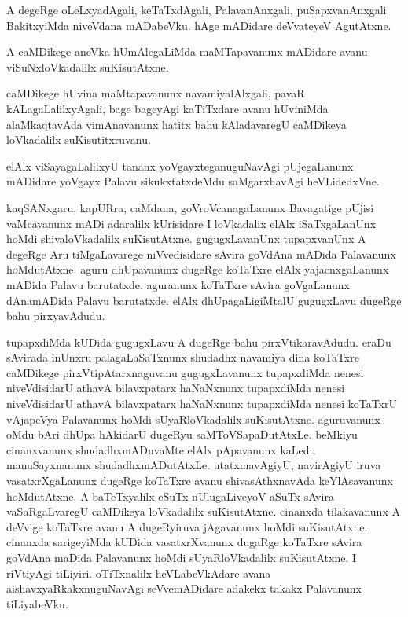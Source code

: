 \documentclass{article}
\begin{document}
\begin{mng}%
A degeRge oLeLxyadAgali, keTaTxdAgali, PalavanAnxgali, puSapxvanAnxgali BakitxyiMda niveVdana 
mADabeVku. hAge mADidare deVvateyeV AgutAtxne.
\end{mng}

\begin{mng}%
A caMDikege aneVka hUmAlegaLiMda maMTapavanunx mADidare avanu viSuNxloVkadalilx suKisutAtxne.
\end{mng}

\begin{mng}%
caMDikege hUvina maMtapavanunx navamiyalAlxgali, pavaR kALagaLalilxyAgali, bage bageyAgi 
kaTiTxdare avanu hUviniMda alaMkaqtavAda vimAnavanunx hatitx bahu kAladavaregU caMDikeya 
loVkadalilx suKisutitxruvanu.
\end{mng}

\begin{mng}%
elAlx viSayagaLalilxyU tananx yoVgayxteganuguNavAgi pUjegaLanunx mADidare yoVgayx Palavu 
sikukxtatxdeMdu saMgarxhavAgi heVLidedxVne.
\end{mng}

\begin{mng}%
kaqSANxgaru, kapURra, caMdana, goVroVcanagaLanunx Bavagatige pUjisi vaMcavanunx mADi adaralilx 
kUrisidare I loVkadalix elAlx iSaTxgaLanUnx hoMdi shivaloVkadalilx suKisutAtxne. gugugxLavanUnx 
tupapxvanUnx A degeRge Aru tiMgaLavarege niVvedisidare sAvira goVdAna mADida Palavanunx 
hoMdutAtxne. aguru dhUpavanunx dugeRge koTaTxre elAlx yajacnxgaLanunx mADida Palavu barutatxde. 
aguranunx koTaTxre sAvira goVgaLanunx dAnamADida Palavu barutatxde. elAlx dhUpagaLigiMtalU 
gugugxLavu dugeRge bahu pirxyavAdudu.
\end{mng}

\begin{mng}%
tupapxdiMda kUDida gugugxLavu A dugeRge bahu pirxVtikaravAdudu. eraDu sAvirada inUnxru 
palagaLaSaTxnunx shudadhx navamiya dina koTaTxre caMDikege pirxVtipAtarxnaguvanu gugugxLavanunx 
tupapxdiMda nenesi niveVdisidarU athavA bilavxpatarx haNaNxnunx tupapxdiMda nenesi niveVdisidarU 
athavA bilavxpatarx haNaNxnunx tupapxdiMda nenesi koTaTxrU vAjapeVya Palavanunx hoMdi 
sUyaRloVkadalilx suKisutAtxne. aguruvanunx oMdu bAri dhUpa hAkidarU dugeRyu saMToVSapaDutAtxLe. 
beMkiyu cinanxvanunx shudadhxmADuvaMte elAlx pApavanunx kaLedu manuSayxnanunx shudadhxmADutAtxLe. 
utatxmavAgiyU, navirAgiyU iruva vasatxrXgaLanunx dugeRge koTaTxre avanu shivasAthxnavAda 
keYlAsavanunx hoMdutAtxne. A baTeTxyalilx eSuTx nUlugaLiveyoV aSuTx sAvira vaSaRgaLvaregU 
caMDikeya loVkadalilx suKisutAtxne. cinanxda tilakavanunx A deVvige koTaTxre avanu A dugeRyiruva 
jAgavanunx hoMdi suKisutAtxne. cinanxda sarigeyiMda kUDida vasatxrXvanunx dugaRge koTaTxre sAvira 
goVdAna maDida Palavanunx hoMdi sUyaRloVkadalilx suKisutAtxne. I riVtiyAgi tiLiyiri. oTiTxnalilx 
heVLabeVkAdare avana aishavxyaRkakxnuguNavAgi seVvemADidare adakekx takakx Palavanunx tiLiyabeVku.
\end{mng}
\end{document}
